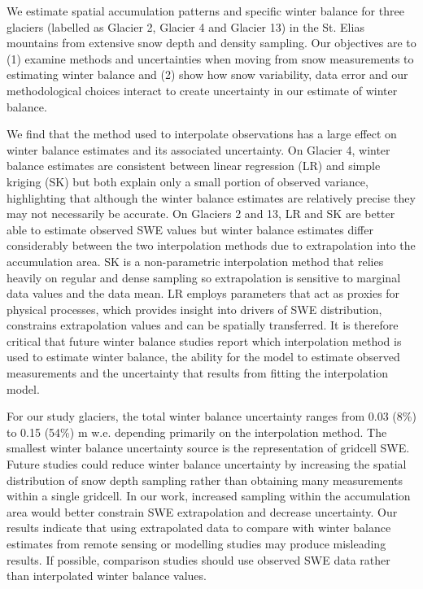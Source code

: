 \documentclass[twocolumn, letterpaper]{igs}
\begin{document}
We estimate spatial accumulation patterns and specific winter balance for three glaciers (labelled as Glacier 2, Glacier 4 and Glacier 13) in the St. Elias mountains from extensive snow depth and density sampling. Our objectives are to (1) examine methods and uncertainties when moving from snow measurements to estimating winter balance and (2) show how snow variability, data error and our methodological choices interact to create uncertainty in our estimate of winter balance.

We find that the method used to interpolate observations has a large effect on winter balance estimates and its associated uncertainty. On Glacier 4, winter balance estimates are consistent between linear regression (LR) and simple kriging (SK) but both explain only a small portion of observed variance, highlighting that although the winter balance estimates are relatively precise they may not necessarily be accurate. On Glaciers 2 and 13, LR and SK are better able to estimate observed SWE values but winter balance estimates differ considerably between the two interpolation methods due to extrapolation into the accumulation area. SK is a non-parametric interpolation method that relies heavily on regular and dense sampling so extrapolation is sensitive to marginal data values and the data mean. LR employs parameters that act as proxies for physical processes, which provides insight into drivers of SWE distribution, constrains extrapolation values and can be spatially transferred. It is therefore critical that future winter balance studies report which interpolation method is used to estimate winter balance, the ability for the model to estimate observed measurements and the uncertainty that results from fitting the interpolation model. 

For our study glaciers, the total winter balance uncertainty ranges from 0.03 (8\%) to 0.15 (54\%) m w.e. depending primarily on the interpolation method. The smallest winter balance uncertainty source is the representation of gridcell SWE. Future studies could reduce winter balance uncertainty by increasing the spatial distribution of snow depth sampling rather than obtaining many measurements within a single gridcell. In our work, increased sampling within the accumulation area would better constrain SWE extrapolation and decrease uncertainty. Our results indicate that using extrapolated data to compare with winter balance estimates from remote sensing or modelling studies may produce misleading results. If possible, comparison studies should use observed SWE data rather than interpolated winter balance values. 
\end{document}

